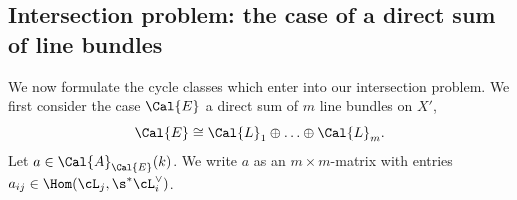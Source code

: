 \subsection{Intersection problem: the case of a direct sum of line bundles}\label{ssec: KR cycle classes}
We now formulate the cycle classes which enter into our intersection problem.  We first consider the case $\Cal{E}$ a direct sum of $m$ line bundles on $X'$,
\begin{equation}
\Cal{E} \cong \Cal{L}_1 \oplus \ldots \oplus \Cal{L}_m.
\end{equation}
Let $a \in \Cal{A}_{\Cal{E}}(k)$. We write $a$ as an $m\times m$-matrix with entries $a_{ij}\in \Hom(\cL_{j}, \s^{*}\cL^{\vee}_{i})$.

